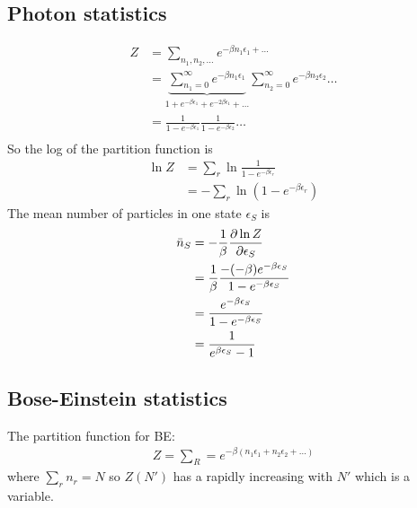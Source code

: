 \documentclass[../main.tex]{subfiles}
\begin{document}
\subsection{Photon statistics}
\begin{align*}
    Z &= \sum_{n_1, n_2, \dots} e^{-\beta n_1 \epsilon_1 + \dots} \\
    &= \underbrace{\sum_{n_1 = 0}^\infty e^{-\beta n_1 \epsilon_1}}_{1 + e^{-\beta \epsilon_1} + e^{-2\beta \epsilon_1} + \dots} \sum_{n_2 = 0}^\infty e^{-\beta n_2 \epsilon_2} \dots \\
    &= \frac{1}{1 - e^{-\beta \epsilon_1}} \frac{1}{1 - e^{-\beta \epsilon_2}} \dots \\
\end{align*}
So the log of the partition function is
\begin{align*}
    \ln Z &= \sum_r \ln \frac{1}{1 - e^{-\beta \epsilon_r}} \\
    &= -\sum_r \ln (1 - e^{-\beta \epsilon_r})
\end{align*}
The mean number of particles in one state $\epsilon_S$ is
\begin{align*}
    \bar n_S &= -\frac{1}{\beta} \pdv{\ln Z}{\epsilon_S} \\
    &= \frac{1}{\beta} \frac{- (-\beta) e^{-\beta \epsilon_S}}{1 - e^{-\beta \epsilon_S}} \\ 
    &= \frac{e^{-\beta \epsilon_S}}{1 - e^{-\beta \epsilon_S}} \\
    & = \frac{1}{e^{\beta \epsilon_S} - 1}
\end{align*}

\subsection{Bose-Einstein statistics}
The partition function for BE:
\begin{align*}
    Z = \sum_R = e^{-\beta (n_1 \epsilon_1 + n_2 \epsilon_2 + \dots)}
\end{align*}
where $\sum_r n_r = N$ so $Z(N')$ has a rapidly increasing with $N'$ which is a variable.
\end{document}

